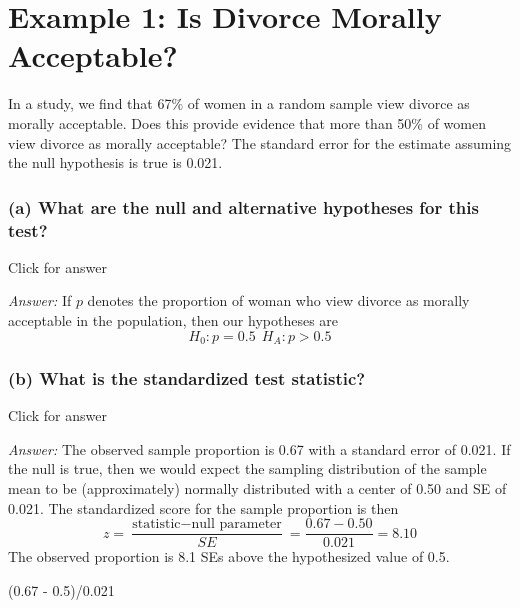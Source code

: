 \documentclass[
]{book}
\newenvironment{Shaded}{\begin{snugshade}}{\end{snugshade}}
\newcommand{\FloatTok}[1]{\textcolor[rgb]{0.00,0.00,0.81}{#1}}
\newcommand{\NormalTok}[1]{#1}
\newcommand{\SpecialCharTok}[1]{\textcolor[rgb]{0.00,0.00,0.00}{#1}}
\begin{document}
\hypertarget{example-1-is-divorce-morally-acceptable}{%
\section{Example 1: Is Divorce Morally Acceptable?}\label{example-1-is-divorce-morally-acceptable}}

In a study, we find that 67\% of women in a random sample view divorce as morally acceptable. Does this provide evidence that more than 50\% of women view divorce as morally acceptable? The standard error for the estimate assuming the null hypothesis is true is 0.021.

\hypertarget{a-what-are-the-null-and-alternative-hypotheses-for-this-test}{%
\subsubsection{(a) What are the null and alternative hypotheses for this test?}\label{a-what-are-the-null-and-alternative-hypotheses-for-this-test}}

Click for answer

\emph{Answer:} If \(p\) denotes the proportion of woman who view divorce as morally acceptable in the population, then our hypotheses are
\[
H_0: p = 0.5 \ \ H_A: p > 0.5
\]

\hypertarget{b-what-is-the-standardized-test-statistic}{%
\subsubsection{(b) What is the standardized test statistic?}\label{b-what-is-the-standardized-test-statistic}}

Click for answer

\emph{Answer:} The observed sample proportion is 0.67 with a standard error of 0.021. If the null is true, then we would expect the sampling distribution of the sample mean to be (approximately) normally distributed with a center of 0.50 and SE of 0.021. The standardized score for the sample proportion is then
\[
z = \dfrac{\textrm{statistic} - \textrm{null parameter}}{SE} = \dfrac{0.67 - 0.50}{0.021} = 8.10
\]
The observed proportion is 8.1 SEs above the hypothesized value of 0.5.

\begin{Shaded}
\begin{Highlighting}[]
\NormalTok{(}\FloatTok{0.67} \SpecialCharTok{{-}} \FloatTok{0.5}\NormalTok{)}\SpecialCharTok{/}\FloatTok{0.021}
\end{Highlighting}
\end{Shaded}
\end{document}
